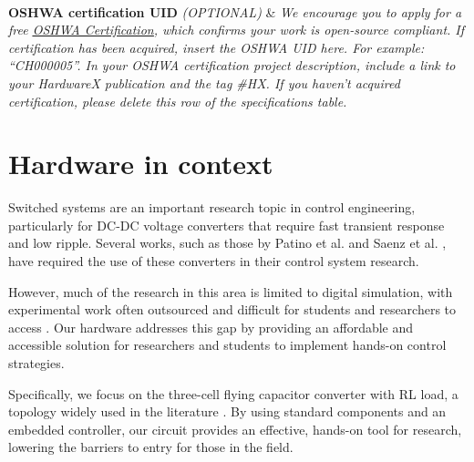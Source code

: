 \documentclass[11pt, letterpaper]{article}
\begin{document}
\begin{flushleft}
\begin{tabu}
    \\
    \hline \textbf{OSHWA certification UID} \vskip 0.1cm {\it (OPTIONAL)} &
    {\it We encourage you to apply for a free \href{https://certification.oshwa.org/}{\underline{OSHWA Certification}}, which confirms your work is open-source compliant.
        \vskip 0.2cm
        If certification has been acquired, insert the OSHWA UID here. For example: “CH000005”. In your OSHWA certification project description, include a link to your HardwareX publication and the tag \#HX.
        \vskip 0.2cm
        If you haven’t acquired certification, please delete this row of the specifications table.}
    \\\hline
  \end{tabu}
\end{flushleft}
\newpage

\section{Hardware in context}

Switched systems are an important research topic in control engineering, particularly for DC-DC voltage 
converters that require fast transient response and low ripple. Several works, such as those by Patino 
et al. \cite{Patino:2010} and Saenz et al. \cite{Saenz:2014}, have required the use of these converters 
in their control system research.

However, much of the research in this area is limited to digital simulation, with experimental work often 
outsourced and difficult for students and researchers to access \cite{Saenz:2014}. Our hardware addresses 
this gap by providing an affordable and accessible solution for researchers and students to implement 
hands-on control strategies.

Specifically, we focus on the three-cell flying capacitor converter with RL load, a topology widely used 
in the literature \cite{Benmiloud:2019} \cite{Patino:2010}. By using standard components and an embedded controller, 
our circuit provides an effective, hands-on tool for research, lowering the barriers to entry for those 
in the field.
\end{document}
